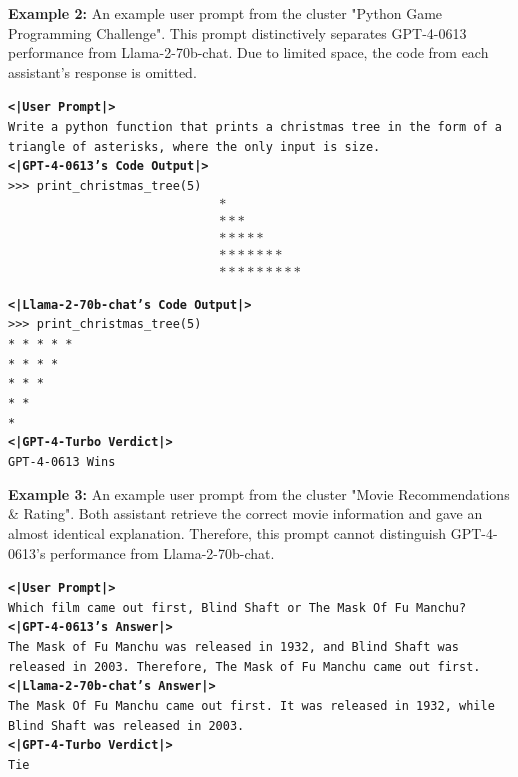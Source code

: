 \documentclass{article}
\begin{document}
\newpage
\textbf{Example 2:} An example user prompt from the cluster "Python Game Programming Challenge". This prompt distinctively separates GPT-4-0613 performance from Llama-2-70b-chat. Due to limited space, the code from each assistant's response is omitted.
\begin{tcolorbox}
\texttt{\textbf{<|User Prompt|>}} \\ 
\texttt{Write a python function that prints a christmas tree in the form of a triangle of asterisks, where the only input is size. }\\

\texttt{\textbf{<|GPT-4-0613's Code Output|>}} \\
\texttt{>{}>{}> print\_christmas\_tree(5)
    \begin{gather*}
    *    \\
    ***   \\
    *****  \\
    ******* \\
    *********
    \end{gather*}}

\texttt{\textbf{<|Llama-2-70b-chat's Code Output|>}} \\
\texttt{>{}>{}> print\_christmas\_tree(5) \\
* * * * * \\
* * * * \\
* * * \\
* * \\
* } \\

\texttt{\textbf{<|GPT-4-Turbo Verdict|>}} \\
\texttt{GPT-4-0613 Wins}
\end{tcolorbox}

\textbf{Example 3:} An example user prompt from the cluster "Movie Recommendations \& Rating". Both assistant retrieve the correct movie information and gave an almost identical explanation. Therefore, this prompt cannot distinguish GPT-4-0613's performance from Llama-2-70b-chat.
\begin{tcolorbox}
\texttt{\textbf{<|User Prompt|>} \\
Which film came out first, Blind Shaft or The Mask Of Fu Manchu?}\\

\texttt{\textbf{<|GPT-4-0613's Answer|>} \\
  The Mask of Fu Manchu was released in 1932, and Blind Shaft was released in 2003. Therefore, The Mask of Fu Manchu came out first.}\\

\texttt{\textbf{<|Llama-2-70b-chat's Answer|>}\\
The Mask Of Fu Manchu came out first. It was released in 1932, while Blind Shaft was released in 2003.} \\

\texttt{\textbf{<|GPT-4-Turbo Verdict|>} \\
Tie
}
\end{tcolorbox}
\end{document}
